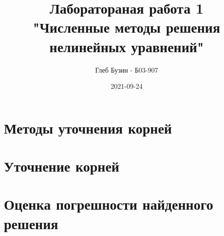 \documentclass[a4paper,11pt]{article}
\title{
    Лаборатораная работа 1 \\
    "Численные методы решения нелинейных уравнений"
}
\date{2021-09-24}
\author{Глеб Бузин - Б03-907}
\begin{document}
\maketitle
\newpage
\tableofcontents
\newpage





\section{Методы уточнения корней}


\newpage
\section{Уточнение корней}


\section{Оценка погрешности найденного решения}













\end{document}
